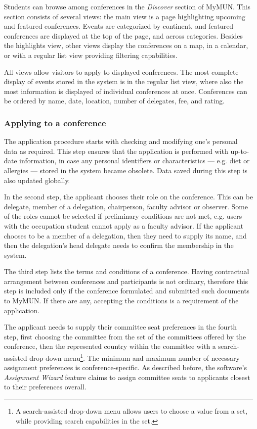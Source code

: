 Students can browse among conferences in the \emph{Discover} section of MyMUN. This section consists of several views: the main view is a page highlighting upcoming and featured conferences. Events are categorized by continent, and featured conferences are displayed at the top of the page, and across categories. Besides the highlights view, other views display the conferences on a map, in a calendar, or with a regular list view providing filtering capabilities.

All views allow visitors to apply to displayed conferences. The most complete display of events stored in the system is in the regular list view, where also the most information is displayed of individual conferences at once. Conferences can be ordered by name, date, location, number of delegates, fee, and rating.

\subsubsection{Applying to a conference}

The application procedure starts with checking and modifying one's personal data as required. This step ensures that the application is performed with up-to-date information, in case any personal identifiers or characteristics — e.g. diet or allergies — stored in the system became obsolete. Data saved during this step is also updated globally.

In the second step, the applicant chooses their role on the conference. This can be delegate, member of a delegation, chairperson, faculty advisor or observer. Some of the roles cannot be selected if preliminary conditions are not met, e.g. users with the occupation student cannot apply as a faculty advisor. If the applicant chooses to be a member of a delegation, then they need to supply its name, and then the delegation's head delegate needs to confirm the membership in the system.

The third step lists the terms and conditions of a conference. Having contractual arrangement between conferences and participants is not ordinary, therefore this step is included only if the conference formulated and submitted such documents to MyMUN. If there are any, accepting the conditions is a requirement of the application.

The applicant needs to supply their committee seat preferences in the fourth step, first choosing the committee from the set of the committees offered by the conference, then the represented country within the committee with a search-assisted drop-down menu\footnote{A search-assisted drop-down menu allows users to choose a value from a set, while providing search capabilities in the set.}. The minimum and maximum number of necessary assignment preferences is conference-specific. As described before, the software's \emph{Assignment Wizard} feature claims to assign committee seats to applicants closest to their preferences overall.

